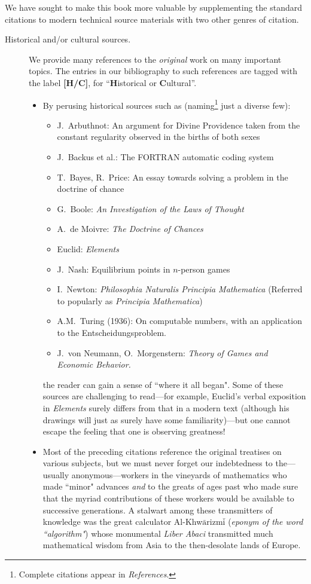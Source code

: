 \noindent
We have sought to make this book more valuable by supplementing the standard citations to modern technical source materials with two other genres of citation.
\begin{description}
\item[{\sc Historical and/or cultural sources}.]
We provide many references to the {\em original} work on many important topics.  The entries in our bibliography to such references are tagged with the label {\bf [H/C]}, for ``{\bf H}istorical or {\bf C}ultural''.
  \begin{itemize}
  \item
By perusing historical sources such as (naming\footnote{Complete citations appear in {\it References}.} just a diverse few): 
     \begin{itemize}
     \item
J.~Arbuthnot: An argument for Divine Providence taken from the constant regularity observed in the births of both sexes
     \medskip\item
J.~Backus et al.: The FORTRAN automatic coding system
      \medskip\item
T.~Bayes, R.~Price: An essay towards solving a problem in the doctrine of chance
      \medskip\item
G.~Boole: {\it An Investigation of the Laws of Thought}   
     \medskip\item
A.~de Moivre: {\it The Doctrine of Chances}
     \medskip\item
Euclid: {\it Elements} 
    \medskip\item
J.~Nash: Equilibrium points in $n$-person games
    \medskip\item
I.~Newton: {\it Philosophia Naturalis Principia Mathematica}
(Referred to popularly as {\it Principia Mathematica})
    \medskip\item
A.M.~Turing (1936): On computable numbers, with an application to the Entscheidungsproblem.
    \medskip\item
J.~von Neumann, O.~Morgenstern: {\it Theory of Games and Economic Behavior.}
    \end{itemize}
the reader can gain a sense of ``where it all began".  Some of these sources are challenging to read---for example, Euclid's verbal exposition in {\it Elements} surely differs from that in a modern text (although his drawings will just as surely have some familiarity)---but one cannot escape the feeling that one is observing greatness!

\medskip\item
Most of the preceding citations reference the original treatises on various subjects, but we must never forget our indebtedness to the---usually anonymous---workers in the vineyards of mathematics who made ``minor" advances {\em and} to the greats of ages past who made sure that the myriad contributions of these workers would be available to successive generations.  A stalwart among these transmitters of knowledge was the great calculator Al-Khw$\bar{\mbox{a}}$rizm$\bar{\mbox{i}}$ ({\em eponym of the word ``algorithm"}) whose monumental {\it Liber Abaci} transmitted much mathematical wisdom from Asia to the then-desolate lands of Europe.


\end{itemize}
\end{description}
